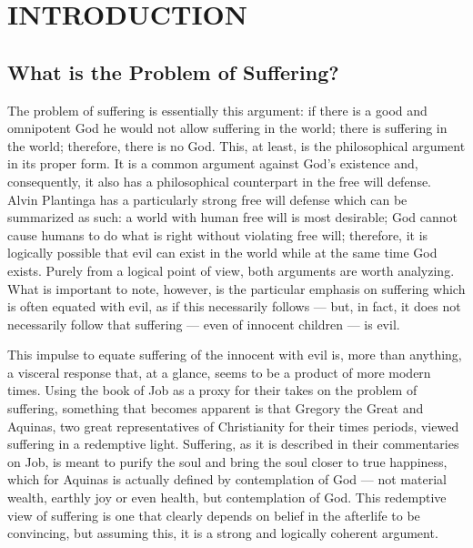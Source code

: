 \chapter{INTRODUCTION}


\label{introduction}

\section{What is the Problem of Suffering?}
The problem of suffering is essentially this argument: if there is a good and omnipotent God he would not allow suffering in the world; there is suffering in the world; therefore, there is no God. This, at least, is the philosophical argument in its proper form. It is a common argument against God's existence and, consequently, it also has a philosophical counterpart in the free will defense. Alvin Plantinga has a particularly strong free will defense which can be summarized as such: a world with human free will is most desirable; God cannot cause humans to do what is right without violating free will; therefore, it is logically possible that evil can exist in the world while at the same time God exists. Purely from a logical point of view, both arguments are worth analyzing. What is important to note, however, is the particular emphasis on suffering which is often equated with evil, as if this necessarily follows --- but, in fact, it does not necessarily follow that suffering --- even of innocent children --- is evil.

This impulse to equate suffering of the innocent with evil is, more than anything, a visceral response that, at a glance, seems to be a product of more modern times. Using the book of Job as a proxy for their takes on the problem of suffering, something that becomes apparent is that Gregory the Great and Aquinas, two great representatives of Christianity for their times periods, viewed suffering in a redemptive light. Suffering, as it is described in their commentaries on Job, is meant to purify the soul and bring the soul closer to true happiness, which for Aquinas is actually defined by contemplation of God --- not material wealth, earthly joy or even health, but contemplation of God. This redemptive view of suffering is one that clearly depends on belief in the afterlife to be convincing, but assuming this, it is a strong and logically coherent argument.


